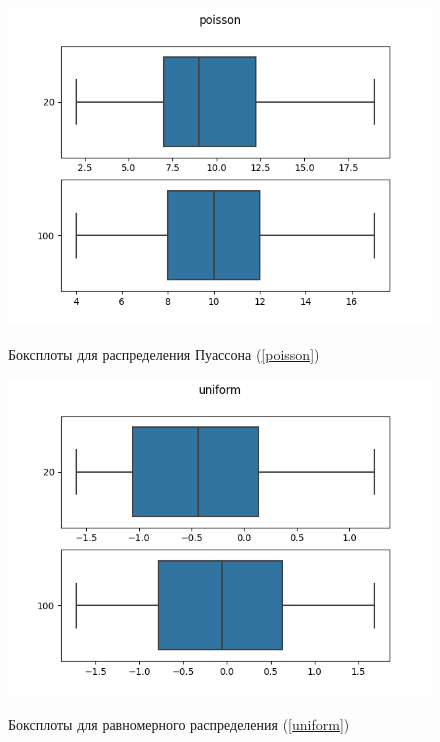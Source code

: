 \documentclass[12pt,a4paper]{article}
\begin{document}
			\begin{figure}[htp]
				{\includegraphics[width=1\linewidth]{../plots/poisson.png}}
				\caption{Боксплоты для распределения Пуассона (\ref{poisson})}
			\end{figure}
			\newpage
			
			\begin{figure}[htp]
				{\includegraphics[width=1\linewidth]{../plots/uniform.png}}
				\caption{Боксплоты для равномерного распределения (\ref{uniform})}
			\end{figure}
			\newpage
\end{document}
